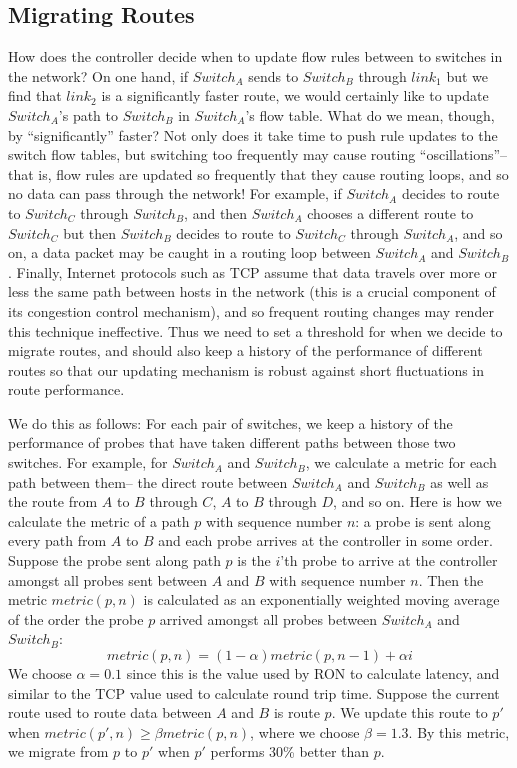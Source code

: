 \documentclass[pageno]{jpaper}
\begin{document}
\subsection{Migrating Routes}

How does the controller decide when to update flow rules between to switches in the network?  On one hand,
if $Switch_A$ sends to $Switch_B$ through $link_1$ but we find that $link_2$ is a significantly faster 
route, we would certainly like to update $Switch_A$'s path to $Switch_B$ in $Switch_A$'s flow table. What do we mean,
though, by ``significantly'' faster?  Not only does it take time to push rule updates to the switch flow tables,
but switching too frequently may cause routing ``oscillations''--that is, flow rules are updated so frequently 
that they cause routing loops, and so no data can pass through the network! For example, if $Switch_A$ decides 
to route to $Switch_C$ through $Switch_B$, and then $Switch_A$ chooses a different route to $Switch_C$ but then
$Switch_B$ decides to route to $Switch_C$ through $Switch_A$, and so on, a data packet may be caught in a routing
loop between $Switch_A$ and $Switch_B$. Finally, Internet protocols such as TCP assume that data travels over
more or less the same path between hosts in the network (this is a crucial component of its congestion control 
mechanism), and so frequent routing changes may render this technique ineffective. Thus we need to set a threshold
for when we decide to migrate routes, and should also keep a history of the performance of different routes so that
our updating mechanism is robust against short fluctuations in route performance. 

We do this as follows:
For each pair of switches, we keep a history of the performance of probes that have taken different paths between
those two switches. For example, for $Switch_A$ and $Switch_B$, we calculate a metric for each path between them--
the direct route between $Switch_A$ and $Switch_B$ as well as the route from $A$ to $B$ through $C$, $A$ to $B$ 
through $D$, and so on. Here is how we calculate the metric of a path $p$ with sequence number $n$: a probe 
is sent along every path from $A$ to $B$ and each probe arrives at the controller in some order. Suppose the probe
sent along path $p$ is the $i$'th probe to arrive at the controller amongst all probes sent between $A$ and $B$ with
sequence number $n$. Then the metric $metric(p,n)$ is calculated as an exponentially weighted moving average of the order
the probe $p$ arrived amongst all probes between $Switch_A$ and $Switch_B$:
$$metric(p,n) = (1-\alpha )metric(p,n-1) + \alpha i$$
We choose $\alpha=0.1$ since this is the value used by RON to calculate latency\cite{ron}, and similar to the TCP
value used to calculate round trip time. Suppose the current route used to route data between $A$ and $B$ is 
route $p$. We update this route to $p'$ when $metric(p',n)\ge \beta metric(p,n)$, where we choose $\beta = 1.3$.
By this metric, we migrate from $p$ to $p'$ when $p'$ performs 30\% better than $p$.
\end{document}
